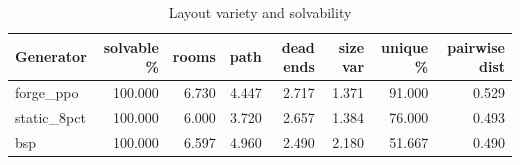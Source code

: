 \begin{table}[ht]
\centering
\small
\begin{tabular}{lrrrrrrr}
\toprule
Generator & solvable \% & rooms & path & dead ends & size var & unique \% & pairwise dist \\
\midrule
forge\_ppo & 100.000 & 6.730 & 4.447 & 2.717 & 1.371 & 91.000 & 0.529 \\
static\_8pct & 100.000 & 6.000 & 3.720 & 2.657 & 1.384 & 76.000 & 0.493 \\
bsp & 100.000 & 6.597 & 4.960 & 2.490 & 2.180 & 51.667 & 0.490 \\
\bottomrule
\end{tabular}
\caption{Layout variety and solvability}
\label{tab:layout_variety}
\end{table}
